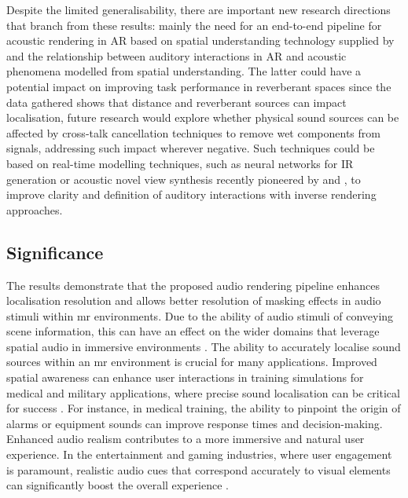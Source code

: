 Despite the limited generalisability, there are important new research directions that branch from these results: mainly the need for an end-to-end pipeline for acoustic rendering in AR based on spatial understanding technology supplied by  and the relationship between auditory interactions in AR and acoustic phenomena modelled from spatial understanding. The latter could have a potential impact on improving task performance in reverberant spaces since the data gathered shows that distance and reverberant sources can impact localisation, future research would explore whether physical sound sources can be affected by cross-talk cancellation techniques to remove wet components from signals, addressing such impact wherever negative. Such techniques could be based on real-time modelling techniques, such as neural networks for IR generation or acoustic novel view synthesis recently pioneered by \cite{ratnarajah2022mesh2ir} and  \cite{chen2023novel}, to improve clarity and definition of auditory interactions with inverse rendering approaches.\par

\subsection{Significance}
The results demonstrate that the proposed audio rendering pipeline enhances localisation resolution and allows better resolution of masking effects in audio stimuli within \acrshort{mr} environments. Due to the ability of audio stimuli of conveying scene information, this can have an effect on the wider domains that leverage spatial audio in immersive environments \citep{yang2022audio}. 
The ability to accurately localise sound sources within an \acrshort{mr} environment is crucial for many applications. Improved spatial awareness can enhance user interactions in training simulations for medical and military applications, where precise sound localisation can be critical for success \citep{vine2023training}. For instance, in medical training, the ability to pinpoint the origin of alarms or equipment sounds can improve response times and decision-making. Enhanced audio realism contributes to a more immersive and natural user experience. In the entertainment and gaming industries, where user engagement is paramount, realistic audio cues that correspond accurately to visual elements can significantly boost the overall experience \citep{slater2009visual}.


